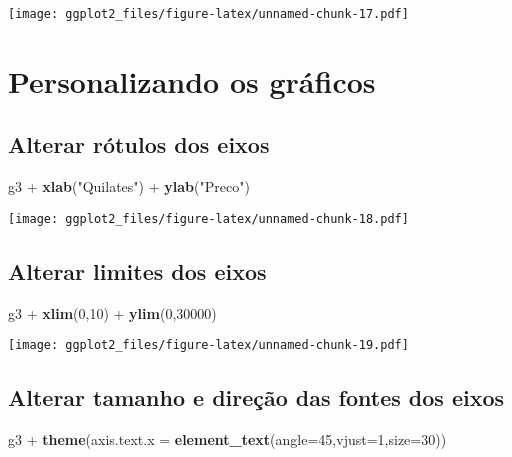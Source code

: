 \documentclass[]{article}
\newenvironment{Shaded}{\begin{snugshade}}{\end{snugshade}}
\newcommand{\KeywordTok}[1]{\textcolor[rgb]{0.13,0.29,0.53}{\textbf{{#1}}}}
\newcommand{\DataTypeTok}[1]{\textcolor[rgb]{0.13,0.29,0.53}{{#1}}}
\newcommand{\DecValTok}[1]{\textcolor[rgb]{0.00,0.00,0.81}{{#1}}}
\newcommand{\StringTok}[1]{\textcolor[rgb]{0.31,0.60,0.02}{{#1}}}
\newcommand{\NormalTok}[1]{{#1}}
\begin{document}
\texttt{[image: ggplot2\_files/figure-latex/unnamed-chunk-17.pdf]}

\newpage

\section{Personalizando os gráficos}\label{personalizando-os-graficos}

\subsection{Alterar rótulos dos eixos}\label{alterar-rotulos-dos-eixos}

\begin{Shaded}
\begin{Highlighting}[]
\NormalTok{g3 +}\StringTok{ }\KeywordTok{xlab}\NormalTok{(}\StringTok{"Quilates"}\NormalTok{) +}\StringTok{ }\KeywordTok{ylab}\NormalTok{(}\StringTok{"Preco"}\NormalTok{)}
\end{Highlighting}
\end{Shaded}

\texttt{[image: ggplot2\_files/figure-latex/unnamed-chunk-18.pdf]}

\newpage

\subsection{Alterar limites dos eixos}\label{alterar-limites-dos-eixos}

\begin{Shaded}
\begin{Highlighting}[]
\NormalTok{g3 +}\StringTok{ }\KeywordTok{xlim}\NormalTok{(}\DecValTok{0}\NormalTok{,}\DecValTok{10}\NormalTok{) +}\StringTok{ }\KeywordTok{ylim}\NormalTok{(}\DecValTok{0}\NormalTok{,}\DecValTok{30000}\NormalTok{)}
\end{Highlighting}
\end{Shaded}

\texttt{[image: ggplot2\_files/figure-latex/unnamed-chunk-19.pdf]}

\newpage

\subsection{Alterar tamanho e direção das fontes dos
eixos}\label{alterar-tamanho-e-direcao-das-fontes-dos-eixos}

\begin{Shaded}
\begin{Highlighting}[]
\NormalTok{g3 +}\StringTok{ }\KeywordTok{theme}\NormalTok{(}\DataTypeTok{axis.text.x =} \KeywordTok{element_text}\NormalTok{(}\DataTypeTok{angle=}\DecValTok{45}\NormalTok{,}\DataTypeTok{vjust=}\DecValTok{1}\NormalTok{,}\DataTypeTok{size=}\DecValTok{30}\NormalTok{))}
\end{Highlighting}
\end{Shaded}
\end{document}
